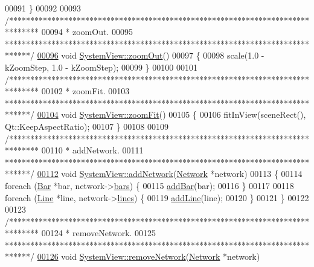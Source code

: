 \begin{DoxyCode}
00091 \}
00092 
00093 \textcolor{comment}{/*******************************************************************************}
00094 \textcolor{comment}{ * zoomOut.}
00095 \textcolor{comment}{ ******************************************************************************/}
\hypertarget{systemview_8cpp_source_l00096}{}\hyperlink{group___graphics_gaf971471c76265ec21cdde2aafe9b609f}{00096} \textcolor{keywordtype}{void} \hyperlink{group___graphics_gaf971471c76265ec21cdde2aafe9b609f}{SystemView::zoomOut}()
00097 \{
00098   scale(1.0 - kZoomStep, 1.0 - kZoomStep);
00099 \}
00100 
00101 \textcolor{comment}{/*******************************************************************************}
00102 \textcolor{comment}{ * zoomFit.}
00103 \textcolor{comment}{ ******************************************************************************/}
\hypertarget{systemview_8cpp_source_l00104}{}\hyperlink{group___graphics_gac1bf0b6a80216df74a8da1cb8ac5f0e8}{00104} \textcolor{keywordtype}{void} \hyperlink{group___graphics_gac1bf0b6a80216df74a8da1cb8ac5f0e8}{SystemView::zoomFit}()
00105 \{
00106   fitInView(sceneRect(), Qt::KeepAspectRatio);
00107 \}
00108 
00109 \textcolor{comment}{/*******************************************************************************}
00110 \textcolor{comment}{ * addNetwork.}
00111 \textcolor{comment}{ ******************************************************************************/}
\hypertarget{systemview_8cpp_source_l00112}{}\hyperlink{group___graphics_gae183447d0777c7b2b940a977f9b64c3f}{00112} \textcolor{keywordtype}{void} \hyperlink{group___graphics_gae183447d0777c7b2b940a977f9b64c3f}{SystemView::addNetwork}(\hyperlink{class_network}{Network} *network)
00113 \{
00114   \textcolor{keywordflow}{foreach} (\hyperlink{class_bar}{Bar} *bar, network->\hyperlink{class_network_a7fe628f7de34a96235cbd3f2cee4aff2}{bars}) \{
00115     \hyperlink{group___graphics_gac4e02019d41c203c788ff1e6f3ee460e}{addBar}(bar);
00116   \}
00117 
00118   \textcolor{keywordflow}{foreach} (\hyperlink{class_line}{Line} *line, network->\hyperlink{class_network_acda0fd42e712e460a08a0e96511ee7eb}{lines}) \{
00119     \hyperlink{group___graphics_gaed2fb15d518cab9a52ea1ee258846bfc}{addLine}(line);
00120   \}
00121 \}
00122 
00123 \textcolor{comment}{/*******************************************************************************}
00124 \textcolor{comment}{ * removeNetwork.}
00125 \textcolor{comment}{ ******************************************************************************/}
\hypertarget{systemview_8cpp_source_l00126}{}\hyperlink{group___graphics_ga2078ad08ff93b9a8683d567e3f9f714e}{00126} \textcolor{keywordtype}{void} \hyperlink{group___graphics_ga2078ad08ff93b9a8683d567e3f9f714e}{SystemView::removeNetwork}(\hyperlink{class_network}{Network} *network)

\end{DoxyCode}
